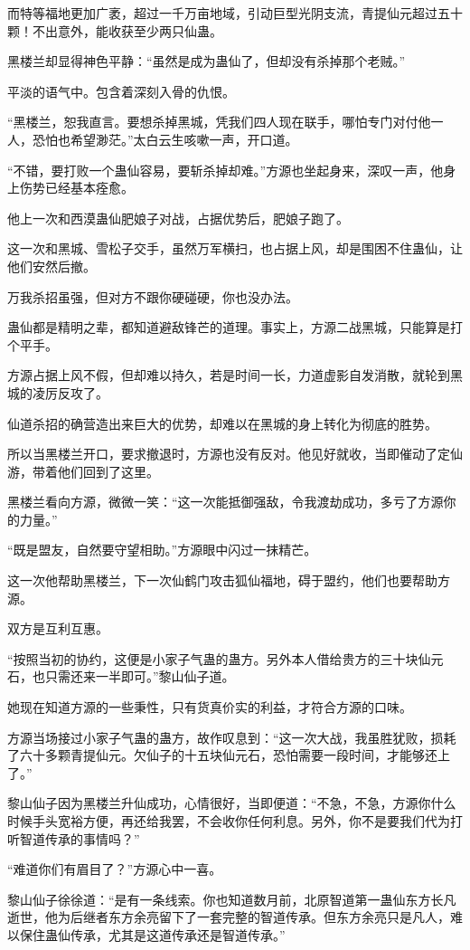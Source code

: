 \begin{this_body}
而特等福地更加广袤，超过一千万亩地域，引动巨型光阴支流，青提仙元超过五十颗！不出意外，能收获至少两只仙蛊。

黑楼兰却显得神色平静：“虽然是成为蛊仙了，但却没有杀掉那个老贼。”

平淡的语气中。包含着深刻入骨的仇恨。

“黑楼兰，恕我直言。要想杀掉黑城，凭我们四人现在联手，哪怕专门对付他一人，恐怕也希望渺茫。”太白云生咳嗽一声，开口道。

“不错，要打败一个蛊仙容易，要斩杀掉却难。”方源也坐起身来，深叹一声，他身上伤势已经基本痊愈。

他上一次和西漠蛊仙肥娘子对战，占据优势后，肥娘子跑了。

这一次和黑城、雪松子交手，虽然万军横扫，也占据上风，却是围困不住蛊仙，让他们安然后撤。

万我杀招虽强，但对方不跟你硬碰硬，你也没办法。

蛊仙都是精明之辈，都知道避敌锋芒的道理。事实上，方源二战黑城，只能算是打个平手。

方源占据上风不假，但却难以持久，若是时间一长，力道虚影自发消散，就轮到黑城的凌厉反攻了。

仙道杀招的确营造出来巨大的优势，却难以在黑城的身上转化为彻底的胜势。

所以当黑楼兰开口，要求撤退时，方源也没有反对。他见好就收，当即催动了定仙游，带着他们回到了这里。

黑楼兰看向方源，微微一笑：“这一次能抵御强敌，令我渡劫成功，多亏了方源你的力量。”

“既是盟友，自然要守望相助。”方源眼中闪过一抹精芒。

这一次他帮助黑楼兰，下一次仙鹤门攻击狐仙福地，碍于盟约，他们也要帮助方源。

双方是互利互惠。

“按照当初的协约，这便是小家子气蛊的蛊方。另外本人借给贵方的三十块仙元石，也只需还来一半即可。”黎山仙子道。

她现在知道方源的一些秉性，只有货真价实的利益，才符合方源的口味。

方源当场接过小家子气蛊的蛊方，故作叹息到：“这一次大战，我虽胜犹败，损耗了六十多颗青提仙元。欠仙子的十五块仙元石，恐怕需要一段时间，才能够还上了。”

黎山仙子因为黑楼兰升仙成功，心情很好，当即便道：“不急，不急，方源你什么时候手头宽裕方便，再还给我罢，不会收你任何利息。另外，你不是要我们代为打听智道传承的事情吗？”

“难道你们有眉目了？”方源心中一喜。

黎山仙子徐徐道：“是有一条线索。你也知道数月前，北原智道第一蛊仙东方长凡逝世，他为后继者东方余亮留下了一套完整的智道传承。但东方余亮只是凡人，难以保住蛊仙传承，尤其是这道传承还是智道传承。”


\end{this_body}
